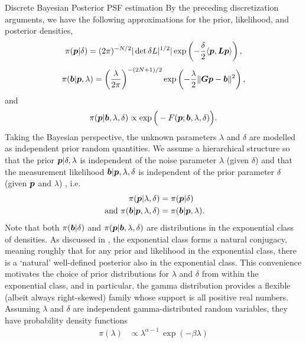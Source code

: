 \begin{chapter}{Discrete Bayesian Posterior PSF estimation}
By the preceding discretization arguments, we have the following approximations for the prior, likelihood, and posterior densities,
\begin{equation}\label{eq:discretePrior}
  \pi(\mbox{\boldmath$p$}| \delta) =(2\pi)^{-N/2} |\det \delta L|^{1/2}|\exp\left(-\frac \delta2 \langle \mbox{\boldmath$p$},\mbox{\boldmath$L$}\mbox{\boldmath$p$}\rangle\right),
\end{equation}
\begin{equation} \label{eq:discreteLiklihood}
  \pi(\mbox{\boldmath$b$} |\mbox{\boldmath$p$},\lambda) = \left(\frac{\lambda}{2\pi}  \right)^{-(2N+1)/2} \exp\left(-\frac \lambda2 \|\mbox{\boldmath$G$}\mbox{\boldmath$p$}-\mbox{\boldmath$b$}\|^2\right),
\end{equation}
and
\begin{equation}\label{eq:discretePosterior}
  \pi(\mbox{\boldmath$p$} | \mbox{\boldmath$b$},\lambda, \delta) \propto \exp\Big(-F(\mbox{\boldmath$p$};\mbox{\boldmath$b$},\lambda,\delta) \Big).
\end{equation}
Taking the Bayesian perspective, the unknown parameters $\lambda$ and $\delta$ are modelled as independent prior random quantities.
We assume a hierarchical structure so that the prior $\mbox{\boldmath$p$}|\delta,\lambda$ is independent of the noise parameter $\lambda$ (given $\delta$) and that the measurement likelihood $\mbox{\boldmath$b$}|\mbox{\boldmath$p$},\lambda,\delta$ is independent of the prior parameter $\delta$ (given $\mbox{\boldmath$p$}$ and $\lambda$) , i.e.
\begin{align}
  \pi(\mbox{\boldmath$p$}|\lambda,\delta) &= \pi(\mbox{\boldmath$p$}|\delta) \\
\text{ and } \pi(\mbox{\boldmath$b$}|\mbox{\boldmath$p$},\lambda,\delta) &= \pi(\mbox{\boldmath$b$}|\mbox{\boldmath$p$},\lambda).
\end{align}
Note that both $\pi(\mbox{\boldmath$b$}|\delta)$ and $\pi(\mbox{\boldmath$p$}|\mbox{\boldmath$b$},\lambda,\delta)$ are distributions in the exponential class of densities.
As discussed in \citep{gelman2014bayesian}, the exponential class forms a natural conjugacy, meaning roughly that for any prior and likelihood in the exponential class, there is a `natural' well-defined posterior also in the exponential class.
This convenience motivates the choice of prior distributions for $\lambda$ and $\delta$ from within the exponential class, and in particular, the gamma distribution provides a flexible (albeit always right-skewed) family whose support is all positive real numbers.
Assuming $\lambda$ and $\delta$ are independent gamma-distributed random variables, they have probability density functions 
\begin{align} 
                \pi(\lambda) &\propto \lambda^{\alpha -1}\,\exp(-\beta\lambda)\label{eq:deltaPrior}\\

\end{align}
\end{chapter}
